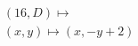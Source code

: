 \documentclass[preview]{standalone}
\begin{document}
\begin{align*}
&(16,D) \mapsto \\& (x,y) \mapsto (x, -y + 2)
\end{align*}
\end{document}
